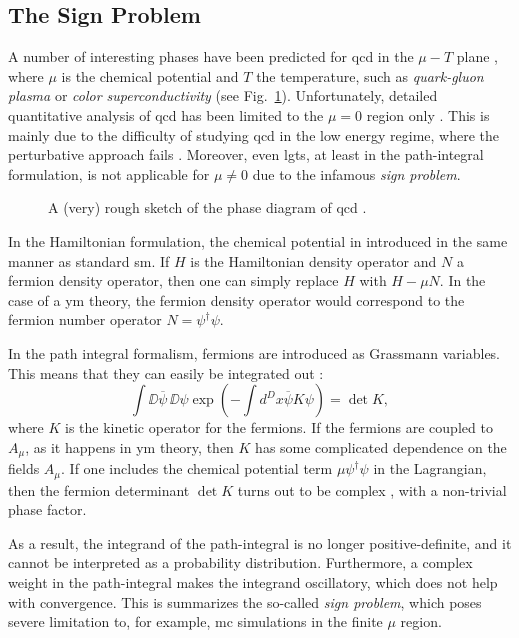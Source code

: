 \subsection{The Sign Problem}
\label{sub:the_sign_problem}

A number of interesting phases have been predicted for \ac{qcd} in the $\mu - T$ plane \cite{aarts2016qcd}, where $\mu$ is the chemical potential and $T$ the temperature, such as \emph{quark-gluon plasma} \cite{detar2009qcdthermo} or \emph{color superconductivity} \cite{alford2001coloursc} (see Fig.~\ref{fig:qcd_phase_diagram}).
Unfortunately, detailed quantitative analysis of \ac{qcd} has been limited to the $\mu = 0$ region only \cite{aarts2016qcd}.
This is mainly due to the difficulty of studying \ac{qcd} in the low energy regime, where the perturbative approach fails \cite{peskin1995qft, creutz1985book}.
Moreover, even \ac{lgt}s, at least in the path-integral formulation, is not applicable for $\mu \neq 0$ due to the infamous \emph{sign problem}.


\begin{figure}[t]
    \centering
    
    \caption{A (very) rough sketch of the phase diagram of \ac{qcd} \cite{aarts2016qcd}.}
    \label{fig:qcd_phase_diagram}
\end{figure}


In the Hamiltonian formulation, the chemical potential in introduced in the same manner as standard \ac{sm}.
If $H$ is the Hamiltonian density operator and $N$ a fermion density operator, then one can simply replace $H$ with $H - \mu N$.
In the case of a \ac{ym} theory, the fermion density operator would correspond to the fermion number operator $N = \psi^{\dagger} \psi$.

In the path integral formalism, fermions are introduced as Grassmann variables.
This means that they can easily be integrated out \cite{peskin1995qft, aarts2016qcd}:
\begin{equation}
    \int \DD \overline{\psi}\, \DD \psi \exp(-\int d^{D}x \overline{\psi} K \psi) = \det K,
\end{equation}
where $K$ is the kinetic operator for the fermions.
If the fermions are coupled to $A_{\mu}$, as it happens in \ac{ym} theory, then $K$ has some complicated dependence on the fields $A_{\mu}$.
If one includes the chemical potential term $\mu \psi^{\dagger} \psi$ in the Lagrangian, then the fermion determinant $\det K$ turns out to be complex \cite{aarts2016qcd}, with a non-trivial phase factor.

As a result, the integrand of the path-integral is no longer positive-definite, and it cannot be interpreted as a probability distribution.
Furthermore, a complex weight in the path-integral makes the integrand oscillatory, which does not help with convergence.
This is summarizes the so-called \emph{sign problem}, which poses severe limitation to, for example, \ac{mc} simulations in the finite $\mu$ region.
